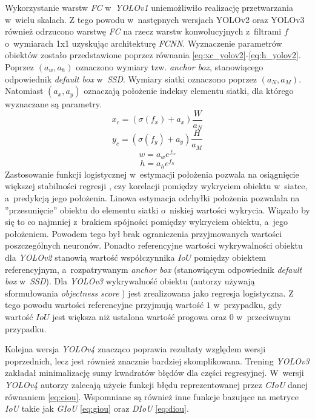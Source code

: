 Wykorzystanie warstw \emph{FC} w~\emph{YOLOv1} uniemożliwiło realizację przetwarzania w~wielu skalach.
Z tego powodu w~następnych wersjach YOLOv2 \cite{yolov2} oraz YOLOv3 \cite{yolov3} również odrzucono warstwę \emph{FC} na rzecz warstw konwolucyjnych z~filtrami $f$ o~wymiarach 1x1 uzyskując architekturę \emph{FCNN}. 
Wyznaczenie parametrów obiektów zostało przedstawione poprzez równania \eqref{eq:xc_yolov2}-\eqref{eq:h_yolov2}. Poprzez $(a_w,a_h)$ oznaczono wymiary tzw. \emph{anchor box}, stanowiącego odpowiednik \emph{default box} w~\emph{SSD}. 
Wymiary siatki oznaczono poprzez $(a_N,a_M)$. Natomiast $(a_x,a_y)$ oznaczają położenie indeksy elementu siatki, dla którego wyznaczane są parametry. 
\begin{equation}
x_c = (\sigma(f_x) + a_x) \frac{W}{a_N}
\label{eq:xc_yolov2}
\end{equation}
\begin{equation}
y_c = (\sigma(f_y) + a_y) \frac{H}{a_M}
\label{eq:yc_yolov2}
\end{equation}
\begin{equation}
w = a_w e^{f_w}
\label{eq:w_yolov2}
\end{equation}
\begin{equation}
h = a_h e^{f_h}
\label{eq:h_yolov2}
\end{equation}
Zastosowanie funkcji logistycznej w~estymacji położenia pozwala na osiągnięcie większej stabilności regresji \cite{yolov2}, czy korelacji pomiędzy wykryciem obiektu w~siatce, a~predykcją jego położenia.
Linowa estymacja odchyłki położenia pozwalała  na ''przesunięcie'' obiektu do elementu siatki o~niskiej wartości wykrycia. 
Wiązało by się to co najmniej z~brakiem spójności pomiędzy wykryciem obiektu, a~jego położeniem.
Powodem tego był brak ograniczenia przyjmowanych wartości poszczególnych neuronów. 
Ponadto referencyjne wartości wykrywalności obiektu dla \emph{YOLOv2} stanowią wartość współczynnika $IoU$ pomiędzy obiektem referencyjnym, a~rozpatrywanym \emph{anchor box} (stanowiącym odpowiednik \emph{default box} w~\emph{SSD}). 
Dla \emph{YOLOv3} wykrywalność obiektu (autorzy używają sformułowania \emph{objectness score} \cite{yolov3}) jest zrealizowana jako regresja logistyczna. 
Z tego powodu wartości referencyjne przyjmują wartość $1$ w~przypadku, gdy wartość $IoU$ jest większa niż ustalona wartość progowa oraz $0$ w~przeciwnym przypadku. 

Kolejna wersja \emph{YOLOv4}\cite{yolov4} znacząco poprawia rezultaty względem wersji poprzednich, lecz jest również znacznie bardziej skomplikowana. Trening \emph{YOLOv3} zakładał minimalizację sumy kwadratów błędów dla części regresyjnej. W~wersji \emph{YOLOv4} autorzy\cite{yolov4} zalecają użycie funkcji błędu reprezentowanej przez \emph{CIoU} \cite{dciou} danej równaniem \eqref{eq:ciou}.
Wspomniane są również inne funkcje bazujące na metryce \emph{IoU} takie jak \emph{GIoU}\cite{giou} \eqref{eq:giou} oraz \emph{DIoU} \cite{dciou} \eqref{eq:diou}.

